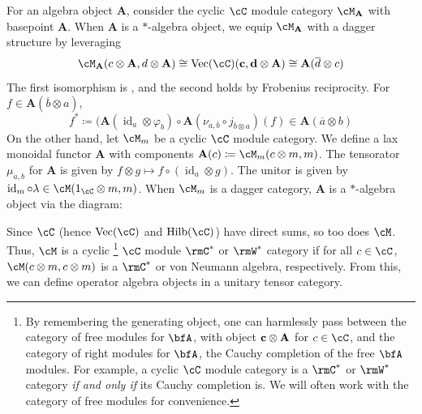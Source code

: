 \documentclass[11pt,reqno]{amsart}
\DeclareMathOperator{\id}{id}
\DeclareMathOperator{\Vect}{Vec}
\DeclareMathOperator{\Hilb}{Hilb}
\newcommand{\bb}[1]{\mathbf{#1}}
\numberwithin{equation}{section}
\theoremstyle{plain}
\begin{document}
For an algebra object $\bb A$, consider the cyclic $\cC$ module category $\cM_{\bb A}$ with basepoint $\bb A$.
When $\bb A$ is a $*$-algebra object, we equip $\cM_{\bb A}$ with a dagger structure by leveraging $$\cM_{\bb A}(c \otimes \bb A, d \otimes \bb A) \cong \Vect(\cC)(\bb c, \bb d \otimes \bb A) \cong \bb A(\overline d \otimes c)$$
The first isomorphism is \cite[Lemma~3.2]{Ost03}, and the second holds by Frobenius reciprocity.
For $f \in \bb A(\overline b \otimes a)$, $$f^* \coloneq (\bb A(\id_a \otimes \varphi_b) \circ \bb A(\nu_{a, \overline b} \circ j_{\overline b \otimes a})(f) \in \bb A(\overline a \otimes b)$$
On the other hand, let $\cM_m$ be a cyclic $\cC$ module category.
We define a lax monoidal functor $\bb A$ with components $\bb A(c) \coloneq \cM_m(c \otimes m, m)$.
The tensorator $\mu_{a, b}$ for $\bb A$ is given by $f \otimes g \mapsto f \circ (\id_a \otimes g)$.
The unitor is given by $\id_m \circ \lambda \in \cM(1_{\cC} \otimes m, m)$.
When $\cM_m$ is a dagger category, $\bb A$ is a $*$-algebra object via the diagram:
\begin{center}
\end{center}


Since $\cC$ (hence $\Vect(\cC)$ and $\Hilb(\cC)$) have direct sums, so too does $\cM$.
Thus, $\cM$ is a cyclic
\footnote{By remembering the generating object, one can harmlessly pass between the category of free modules for $\bfA$, with object $\bf c \otimes \bf A$ for $c \in \cC$, and the category of right modules for $\bfA$, the Cauchy completion of the free $\bfA$ modules.
For example, a cyclic $\cC$ module category is a $\rmC^*$ or $\rmW^*$ category \emph{if and only if} its Cauchy completion is.
We will often work with the category of free modules for convenience.}
$\cC$ module $\rmC^*$ or $\rmW^*$ category if for all $c \in \cC$, $\cM(c \otimes m, c \otimes m)$ is a $\rmC^*$ or von Neumann algebra, respectively.
From this, we can define operator algebra objects in a unitary tensor category.
\end{document}
